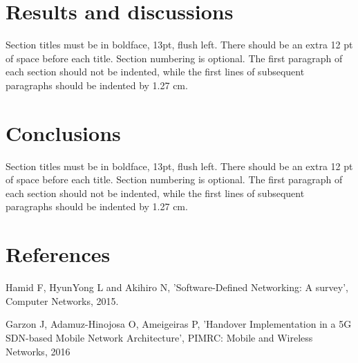 \documentclass[12pt]{article}
\begin{document}
\section{Results and discussions}

Section titles must be in boldface, 13pt, flush left. There should be an extra
12 pt of space before each title. Section numbering is optional. The first
paragraph of each section should not be indented, while the first lines of
subsequent paragraphs should be indented by 1.27 cm.

\section{Conclusions}

Section titles must be in boldface, 13pt, flush left. There should be an extra
12 pt of space before each title. Section numbering is optional. The first
paragraph of each section should not be indented, while the first lines of
subsequent paragraphs should be indented by 1.27 cm.


\section{References}
      Hamid F, HyunYong L and Akihiro N, ’Software-Defined Networking: A survey’, Computer Networks, 2015.

      Garzon J, Adamuz-Hinojosa O, Ameigeiras P, ’Handover Implementation in a 5G SDN-based Mobile Network Architecture’, PIMRC: Mobile and Wireless Networks, 2016



\end{document}
